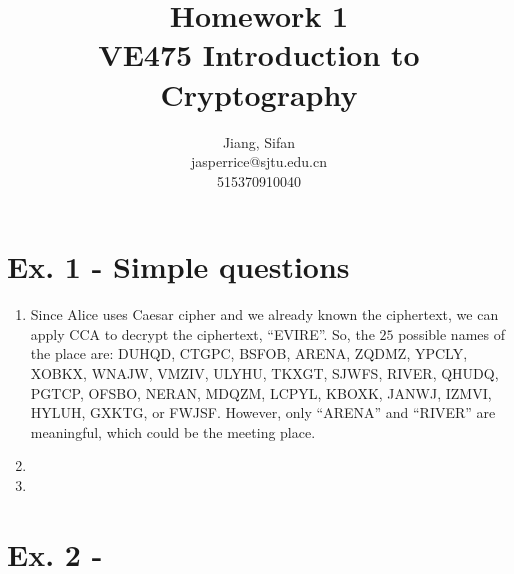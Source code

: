 \documentclass[11pt,a4paper]{article}
\title{
	Homework 1\\
	VE475 Introduction to Cryptography
}
\author{
	Jiang, Sifan\\
	jasperrice@sjtu.edu.cn\\
	515370910040
}
\begin{document}
\maketitle

\section*{Ex. 1 - Simple questions}
\begin{enumerate}
	\item Since Alice uses Caesar cipher and we already known the ciphertext, we can apply CCA to decrypt the ciphertext, ``EVIRE''. So, the $25$ possible names of the place are: DUHQD, CTGPC, BSFOB, ARENA, ZQDMZ, YPCLY, XOBKX, WNAJW, VMZIV, ULYHU, TKXGT, SJWFS, RIVER, QHUDQ, PGTCP, OFSBO, NERAN, MDQZM, LCPYL, KBOXK, JANWJ, IZMVI, HYLUH, GXKTG, or FWJSF. However, only ``ARENA'' and ``RIVER'' are meaningful, which could be the meeting place.
	
	\item 
	
	\item 
\end{enumerate}

\section*{Ex. 2 - }
	
\end{document}
